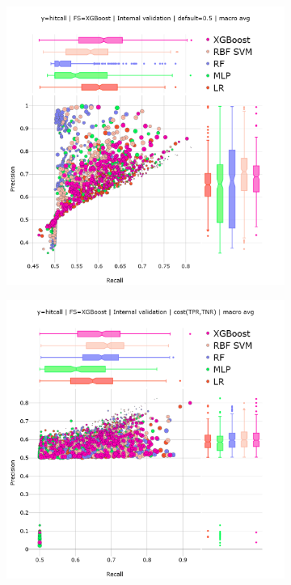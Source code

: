 \begin{figure}[h]
    \centering
    \begin{subfigure}[b]{0.48\textwidth}
        \centering
        \includegraphics[width=\textwidth]{generated_results/hitcall_classification_Feature_Selection_XGBClassifier_val_default_macro_avg.png}
        \caption{}
    \label{fig:hitcall_classification_Feature_Selection_XGBClassifier_val_default_macro_avg}
    \end{subfigure}
    \hfill
    \begin{subfigure}[b]{0.48\textwidth}
        \centering
        \includegraphics[width=\textwidth]{generated_results/hitcall_classification_Feature_Selection_XGBClassifier_val_optimal_macro_avg.png}

\end{subfigure}
\end{figure}
